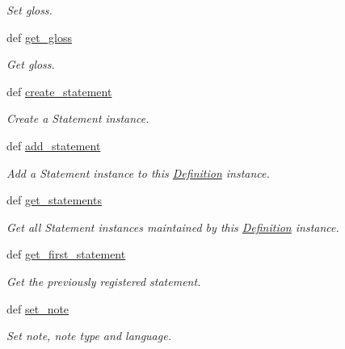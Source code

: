 \begin{DoxyCompactItemize}
\begin{DoxyCompactList}\small\item\em Set gloss. \end{DoxyCompactList}\item 
def \hyperlink{classlmf_1_1src_1_1core_1_1definition_1_1_definition_a95fda914d8a1946e02a53d0f4b954c6b}{get\+\_\+gloss}
\begin{DoxyCompactList}\small\item\em Get gloss. \end{DoxyCompactList}\item 
def \hyperlink{classlmf_1_1src_1_1core_1_1definition_1_1_definition_a5c0a543d23836e3ee76682135a9898c6}{create\+\_\+statement}
\begin{DoxyCompactList}\small\item\em Create a Statement instance. \end{DoxyCompactList}\item 
def \hyperlink{classlmf_1_1src_1_1core_1_1definition_1_1_definition_abda7491b111a5fd96089f9f8b2edd892}{add\+\_\+statement}
\begin{DoxyCompactList}\small\item\em Add a Statement instance to this \hyperlink{classlmf_1_1src_1_1core_1_1definition_1_1_definition}{Definition} instance. \end{DoxyCompactList}\item 
def \hyperlink{classlmf_1_1src_1_1core_1_1definition_1_1_definition_adab2b262bd4599b330b55a0afc1ea490}{get\+\_\+statements}
\begin{DoxyCompactList}\small\item\em Get all Statement instances maintained by this \hyperlink{classlmf_1_1src_1_1core_1_1definition_1_1_definition}{Definition} instance. \end{DoxyCompactList}\item 
def \hyperlink{classlmf_1_1src_1_1core_1_1definition_1_1_definition_ab82b632b8025cbfd8a773dbb5e068002}{get\+\_\+first\+\_\+statement}
\begin{DoxyCompactList}\small\item\em Get the previously registered statement. \end{DoxyCompactList}\item 
def \hyperlink{classlmf_1_1src_1_1core_1_1definition_1_1_definition_aa8733f052ebd8ee819295cd09588dbae}{set\+\_\+note}
\begin{DoxyCompactList}\small\item\em Set note, note type and language. \end{DoxyCompactList}\item 

\end{DoxyCompactItemize}
